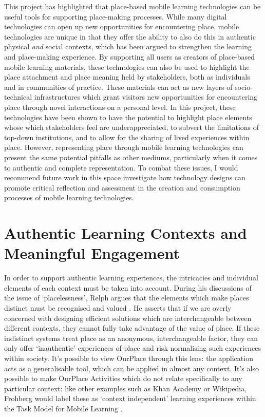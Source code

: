 This project has highlighted that place-based mobile learning technologies can be useful tools for supporting place-making processes. While many digital technologies can open up new opportunities for encountering place, mobile technologies are unique in that they offer the ability to also do this in authentic physical \textit{and} social contexts, which has been argued to strengthen the learning and place-making experience. By supporting all users as creators of place-based mobile learning materials, these technologies can also be used to highlight the place attachment and place meaning held by stakeholders, both as individuals and in communities of practice. These materials can act as new layers of socio-technical infrastructures which grant visitors new opportunities for encountering place through novel interactions on a personal level. In this project, these technologies have been shown to have the potential to highlight place elements whose which stakeholders feel are underappreciated, to subvert the limitations of top-down institutions, and to allow for the sharing of lived experiences within place. However, representing place through mobile learning technologies can present the same potential pitfalls as other mediums, particularly when it comes to authentic and complete representation. To combat these issues, I would recommend future work in this space investigate how technology designs can promote critical reflection and assessment in the creation and consumption processes of mobile learning technologies.

\section{Authentic Learning Contexts and Meaningful Engagement}

In order to support authentic learning experiences, the intricacies and individual elements of each context must be taken into account. During his discussions of the issue of `placelessness', Relph argues that the elements which make places distinct must be recognised and valued \citep{Relph1976}. He asserts that if we are overly concerned with designing efficient solutions which are interchangeable between different contexts, they cannot fully take advantage of the value of place. If these indistinct systems treat place as an anonymous, interchangeable factor, they can only offer `inauthentic' experiences of place and risk normalising such experiences within society. It's possible to view OurPlace through this lens: the application acts as a generalisable tool, which can be applied in almost any context. It's also possible to make OurPlace Activities which do not relate specifically to any particular context: like other examples such as Khan Academy or Wikipedia, Frohberg would label these as `context independent' learning experiences within the Task Model for Mobile Learning \citep{Frohberg2009, Taylor2006}. 

